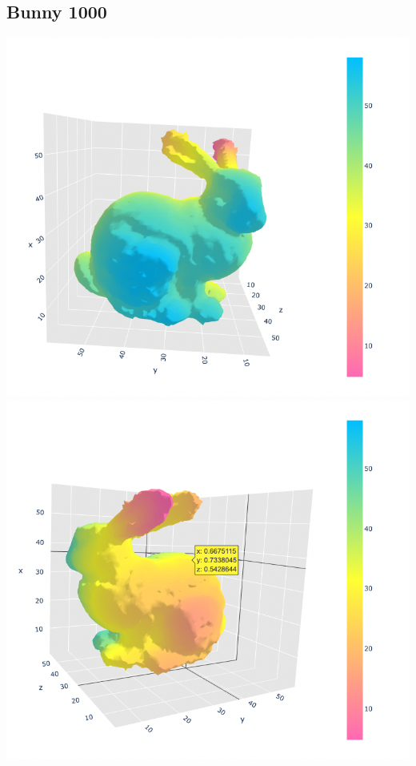 \documentclass{article}
\begin{document}
\subsection*{Bunny 1000}
\includegraphics[scale=0.4]{images/1000naive}
\newline 
\includegraphics[scale=0.4]{images/1000naive2}
\end{document}
